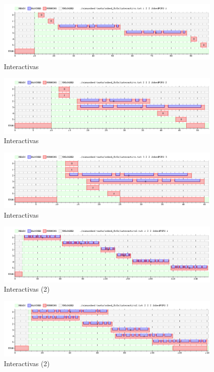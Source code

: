 \documentclass[11pt, a4paper, twoside]{article}
\begin{document}
\begin{figure}[H]
  \includegraphics [width=\textwidth]{../graficos/sched_fcfs/interactivo.png}
  \caption{Interactivas}
\end{figure}
\begin{figure}[H]
  \includegraphics [width=\textwidth]{../graficos/sched_fcfs/interactivo_2.png}
  \caption{Interactivas}
\end{figure}
\begin{figure}[H]
  \includegraphics [width=\textwidth]{../graficos/sched_fcfs/interactivo_3.png}
  \caption{Interactivas}
\end{figure}
\begin{figure}[H]
  \includegraphics [width=\textwidth]{../graficos/sched_fcfs/interactivo2.png}
  \caption{Interactivas (2)}
\end{figure}
\begin{figure}[H]
  \includegraphics [width=\textwidth]{../graficos/sched_fcfs/interactivo2_2.png}
  \caption{Interactivas (2)}
\end{figure}
\end{document}
